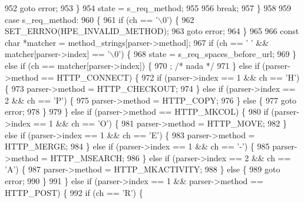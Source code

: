 \begin{DoxyCode}
952             \textcolor{keywordflow}{goto} error;
953         \}
954         state = s_req_method;
955 
956         \textcolor{keywordflow}{break};
957       \}
958 
959       \textcolor{keywordflow}{case} s_req_method:
960       \{
961         \textcolor{keywordflow}{if} (ch == \textcolor{charliteral}{'\(\backslash\)0'}) \{
962           SET_ERRNO(HPE_INVALID_METHOD);
963           \textcolor{keywordflow}{goto} error;
964         \}
965 
966         \textcolor{keyword}{const} \textcolor{keywordtype}{char} *matcher = method_strings[parser->method];
967         \textcolor{keywordflow}{if} (ch == \textcolor{charliteral}{' '} && matcher[parser->index] == \textcolor{charliteral}{'\(\backslash\)0'}) \{
968           state = s_req_spaces_before_url;
969         \} \textcolor{keywordflow}{else} \textcolor{keywordflow}{if} (ch == matcher[parser->index]) \{
970           ; \textcolor{comment}{/* nada */}
971         \} \textcolor{keywordflow}{else} \textcolor{keywordflow}{if} (parser->method == HTTP_CONNECT) \{
972           \textcolor{keywordflow}{if} (parser->index == 1 && ch == \textcolor{charliteral}{'H'}) \{
973             parser->method = HTTP_CHECKOUT;
974           \} \textcolor{keywordflow}{else} \textcolor{keywordflow}{if} (parser->index == 2  && ch == \textcolor{charliteral}{'P'}) \{
975             parser->method = HTTP_COPY;
976           \} \textcolor{keywordflow}{else} \{
977             \textcolor{keywordflow}{goto} error;
978           \}
979         \} \textcolor{keywordflow}{else} \textcolor{keywordflow}{if} (parser->method == HTTP_MKCOL) \{
980           \textcolor{keywordflow}{if} (parser->index == 1 && ch == \textcolor{charliteral}{'O'}) \{
981             parser->method = HTTP_MOVE;
982           \} \textcolor{keywordflow}{else} \textcolor{keywordflow}{if} (parser->index == 1 && ch == \textcolor{charliteral}{'E'}) \{
983             parser->method = HTTP_MERGE;
984           \} \textcolor{keywordflow}{else} \textcolor{keywordflow}{if} (parser->index == 1 && ch == \textcolor{charliteral}{'-'}) \{
985             parser->method = HTTP_MSEARCH;
986           \} \textcolor{keywordflow}{else} \textcolor{keywordflow}{if} (parser->index == 2 && ch == \textcolor{charliteral}{'A'}) \{
987             parser->method = HTTP_MKACTIVITY;
988           \} \textcolor{keywordflow}{else} \{
989             \textcolor{keywordflow}{goto} error;
990           \}
991         \} \textcolor{keywordflow}{else} \textcolor{keywordflow}{if} (parser->index == 1 && parser->method == HTTP_POST) \{
992           \textcolor{keywordflow}{if} (ch == \textcolor{charliteral}{'R'}) \{

\end{DoxyCode}
